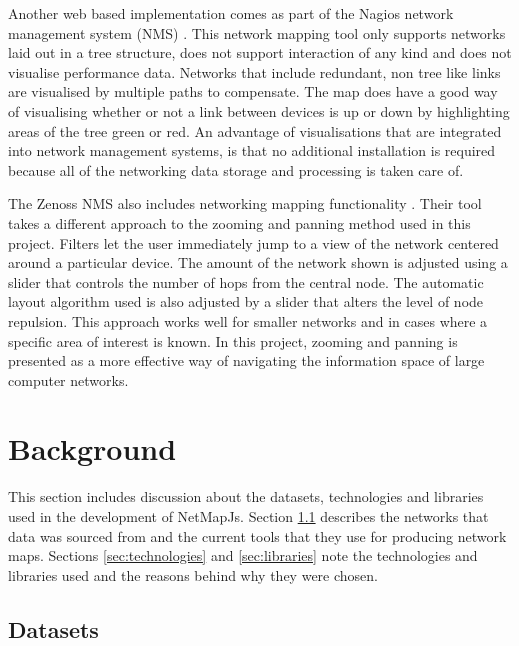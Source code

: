 \documentclass[11pt, a4paper]{article}
\begin{document}
Another web based implementation comes as part of the Nagios network management
system (NMS) \cite{Nagios_website}. This network mapping tool only supports networks
laid out in a tree structure, does not support interaction of any kind and does
not visualise performance data. Networks that include redundant, non tree like
links are visualised by multiple paths to compensate. The map does have a good
way of visualising whether or not a link between devices is up or down by
highlighting areas of the tree green or red. An advantage of visualisations that
are integrated into network management systems, is that no additional
installation is required because all of the networking data storage and
processing is taken care of.

The Zenoss NMS also includes networking mapping functionality
\cite{Zenoss_website}. Their tool takes a different approach to the zooming and
panning method used in this project. Filters let the user immediately jump to a
view of the network centered around a particular device. The amount of the
network shown is adjusted using a slider that controls the number of hops from
the central node. The automatic layout algorithm used is also adjusted by a
slider that alters the level of node repulsion. This approach works well for
smaller networks and in cases where a specific area of interest is known. In
this project, zooming and panning is presented as a more effective way of
navigating the information space of large computer networks.

\newpage

\section{Background}
\label{sec:background}

This section includes discussion about the datasets, technologies and libraries
used in the development of NetMapJs. Section \ref{sec:datasets} describes the
networks that data was sourced from and the current tools that they use for
producing network maps. Sections \ref{sec:technologies} and \ref{sec:libraries}
note the technologies and libraries used and the reasons behind why they were
chosen.

\subsection{Datasets}
\label{sec:datasets}
\end{document}
